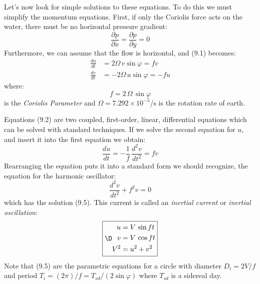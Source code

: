 Let's now look for simple solutions to these equations. To do this we must
simplify the momentum equations. First, if only the Coriolis force acts on
the water, there must be no horizontal pressure gradient:
\begin{displaymath}
\frac{\partial{p}}{\partial{x}} = \frac{\partial{p}}{\partial{y}} = 0
\end{displaymath}
Furthermore, we can assume that the flow is horizontal, and (9.1) becomes:
\begin{subequations}
\begin{align}
\frac{du}{dt}&=2\Omega \,v \sin\varphi =fv \\
\frac{dv}{dt}&=-2\Omega \,u \sin\varphi = -fu
\end{align}
\end{subequations}
where:
\begin{equation}
\boxed{f = 2\,\Omega\,\sin\varphi }
\end{equation}
is the \textit{Coriolis Parameter} and $\Omega = 7.292 \times
10^{-5}$/s is the rotation rate of earth.

Equations (9.2) are two coupled, first-order, linear, differential equations which
can be solved with standard techniques. If we solve the second equation for $u$,
and insert it into the first equation we obtain:
\begin{displaymath}
\frac{du}{dt}=-\frac{1}{f}\,\frac{d^2v}{dt^2}=fv
\end{displaymath}
Rearranging the equation puts it into a standard form we should recognize, the
equation for the harmonic oscillator:
\begin{equation}
\frac{d^2v}{dt^2} + f^2v = 0
\end{equation}
which has the solution (9.5). This current is called an \textit{inertial
current} or
\textit{inertial oscillation}:
\begin{equation}
\fbox{$ \D \begin{aligned}%
u &= V\, \sin ft \\
v &= V\, \cos ft \\
V^2  &= u^2+v^2 \end{aligned}$}
\end{equation}
Note that (9.5) are the parametric equations for a circle with diameter
$D_i = 2V/f$ and period $T_i = (2\pi)/f= T_{sd}/(2\sin\varphi)$ where $T_{sd}$ is
a sidereal day.

